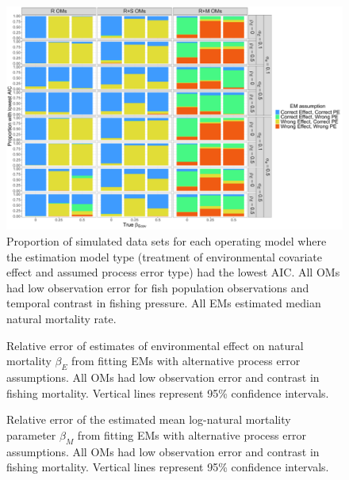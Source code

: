 \documentclass[
  12pt,
]{article}
\begin{document}
\begin{landscape}
\begin{figure}
\begin{center}
\includegraphics[height = \textheight]{aic_main}
\end{center}
\caption{Proportion of simulated data sets for each operating model where the estimation model type (treatment of environmental covariate effect and  assumed process error type) had the lowest AIC. All OMs had low observation error for fish population observations and temporal contrast in fishing pressure. All EMs estimated median natural mortality rate.}\label{aic}
\end{figure}
\end{landscape}

\begin{landscape}
\begin{figure}
\begin{center}
\end{center}
\caption{Relative error of estimates of environmental effect on natural mortality $\beta_E$ from fitting EMs with alternative process error assumptions. All OMs had low observation error and contrast in fishing mortality. Vertical lines represent 95\% confidence intervals.}\label{ecov_beta_bias}
\end{figure}
\end{landscape}

\begin{landscape}
\begin{figure}
\begin{center}
\end{center}
\caption{Relative error of the estimated mean log-natural mortality parameter $\beta_{M}$ from fitting EMs with alternative process error assumptions. All OMs had low observation error and contrast in fishing mortality. Vertical lines represent 95\% confidence intervals.}\label{median_log_M_bias}
\end{figure}
\end{landscape}
\end{document}
